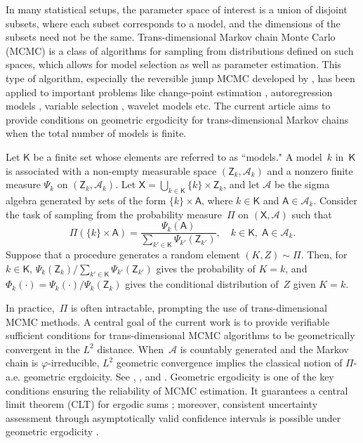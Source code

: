 \documentclass[12pt]{article}
\newcommand{\X}{\mathsf{X}}
\newcommand{\Z}{\mathsf{Z}}
\newcommand{\SF}{\mathcal{A}}
\newcommand{\A}{\mathcal{A}}
\begin{document}
In many statistical setups, the parameter space of interest is a union of disjoint subsets, where each subset corresponds to a model, and the dimensions of the subsets need not be the same.
Trans-dimensional Markov chain Monte Carlo (MCMC) is a class of algorithms for sampling from distributions defined on such spaces, which allows for model selection as well as parameter estimation.
This type of algorithm, especially the reversible jump MCMC developed by \cite{green1995reversible}, has been applied to important problems like change-point estimation \citep{green1995reversible}, autoregression models \citep{troughton1998reversible, ehlers2002efficient, vermaak2004reversible}, variable selection \citep{chevallier2022reversible}, wavelet models \citep{cornish2015bayeswave} etc.
The current article aims to provide conditions on geometric ergodicity for trans-dimensional Markov chains when the total number of models is finite.

Let $\mathsf{K}$ be a finite set whose elements are referred to as ``models."
A model~$k$ in~$\mathsf{K}$ is associated with a non-empty measurable space $(\Z_k, \A_k)$ and a nonzero finite measure $\Psi_k$ on $(\Z_k, \A_k)$.
Let $\X = \bigcup_{k \in \mathsf{K}} \{k\} \times \Z_k$, and let $\SF$ be the sigma algebra generated by sets of the form $\{k\} \times \mathsf{A}$, where $k \in \mathsf{K}$ and $\mathsf{A} \in \A_k$.
Consider the task of sampling from the probability measure~$\Pi$ on $(\X, \SF)$ such that
\begin{equation} \label{eq:Pi}
	\Pi(\{k\} \times \mathsf{A}) = \frac{\Psi_k(\mathsf{A})}{ \sum_{k' \in \mathsf{K}} \Psi_{k'}(\Z_{k'}) }, \quad k \in \mathsf{K}, \; \mathsf{A} \in \A_k.
\end{equation}
Suppose that a procedure generates a random element $(K,Z) \sim \Pi$.
Then, for $k \in \mathsf{K}$, $\Psi_k(\Z_k)/ \sum_{k' \in \mathsf{K}} \Psi_{k'}(\Z_{k'})$ gives the probability of $K = k$, and $\Phi_k(\cdot) = \Psi_k(\cdot)/\Psi_k(\Z_k)$ gives the conditional distribution of~$Z$ given $K = k$.



In practice,~$\Pi$ is often intractable, prompting the use of trans-dimensional MCMC methods.
A central goal of the current work is to provide verifiable sufficient conditions for trans-dimensional MCMC algorithms to be geometrically convergent in the $L^2$ distance.
When~$\SF$ is countably generated and the Markov chain is $\varphi$-irreducible, $L^2$ geometric convergence implies the classical notion of $\Pi$-a.e. geometric ergdoicity.
See \cite{roberts1997geometric}, \cite{roberts2001geometric}, and \cite{gallegos2023equivalences}.
Geometric ergodicity is one of the key conditions ensuring the reliability of MCMC estimation.
It guarantees a central limit theorem (CLT) for ergodic sums \citep{jones2001honest}; moreover, consistent uncertainty assessment through asymptotically valid confidence intervals is possible under geometric ergodicity \citep{vats2019multivariate}.
\end{document}
